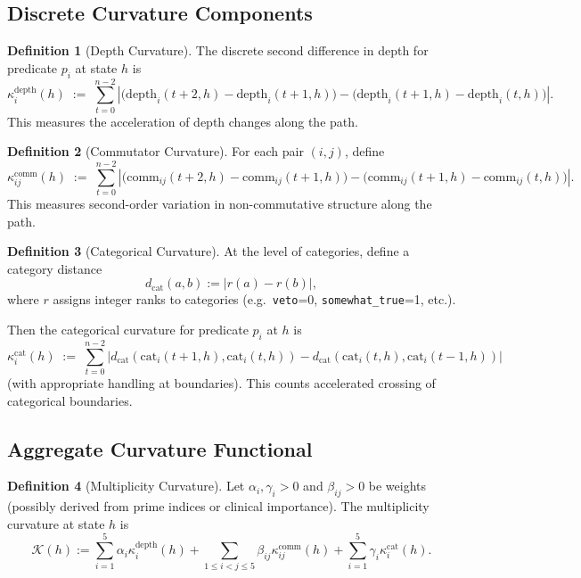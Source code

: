 \documentclass[11pt]{article}
\theoremstyle{definition}
\newtheorem{defn}{Definition}[section]
\theoremstyle{plain}
\theoremstyle{remark}
\begin{document}
\subsection{Discrete Curvature Components}

\begin{defn}[Depth Curvature]
The discrete second difference in depth for predicate \(p_i\) at state \(h\) is
\[
  \kappa_i^{\text{depth}}(h)
  \;:=\;
  \sum_{t=0}^{n-2}
  \left|
    \big(\text{depth}_i(t+2,h) - \text{depth}_i(t+1,h)\big)
    -
    \big(\text{depth}_i(t+1,h) - \text{depth}_i(t,h)\big)
  \right|.
\]
This measures the acceleration of depth changes along the path.
\end{defn}

\begin{defn}[Commutator Curvature]
For each pair \((i,j)\), define
\[
  \kappa_{ij}^{\text{comm}}(h)
  \;:=\;
  \sum_{t=0}^{n-2}
  \left|
    \big(\text{comm}_{ij}(t+2,h) - \text{comm}_{ij}(t+1,h)\big)
    -
    \big(\text{comm}_{ij}(t+1,h) - \text{comm}_{ij}(t,h)\big)
  \right|.
\]
This measures second-order variation in non-commutative structure along the path.
\end{defn}

\begin{defn}[Categorical Curvature]
At the level of categories, define a category distance
\[
  d_{\text{cat}}(a,b) := |r(a) - r(b)|,
\]
where \(r\) assigns integer ranks to categories (e.g.\ \texttt{veto}=0, \texttt{somewhat\_true}=1, etc.).

Then the categorical curvature for predicate \(p_i\) at \(h\) is
\[
  \kappa_i^{\text{cat}}(h)
  \;:=\;
  \sum_{t=0}^{n-2}
  \left|
    d_{\text{cat}}(\text{cat}_i(t+1,h),\text{cat}_i(t,h))
    -
    d_{\text{cat}}(\text{cat}_i(t,h),\text{cat}_i(t-1,h))
  \right|
\]
(with appropriate handling at boundaries). This counts accelerated crossing of categorical boundaries.
\end{defn}

\subsection{Aggregate Curvature Functional}

\begin{defn}[Multiplicity Curvature]
Let \(\alpha_i,\gamma_i>0\) and \(\beta_{ij}>0\) be weights (possibly derived from prime indices or clinical importance). The multiplicity curvature at state \(h\) is
\[
  \mathcal{K}(h)
  :=
  \sum_{i=1}^5 \alpha_i \kappa_i^{\text{depth}}(h)
  +
  \sum_{1\le i<j\le 5} \beta_{ij} \kappa_{ij}^{\text{comm}}(h)
  +
  \sum_{i=1}^5 \gamma_i \kappa_i^{\text{cat}}(h).
\]
\end{defn}
\end{document}
